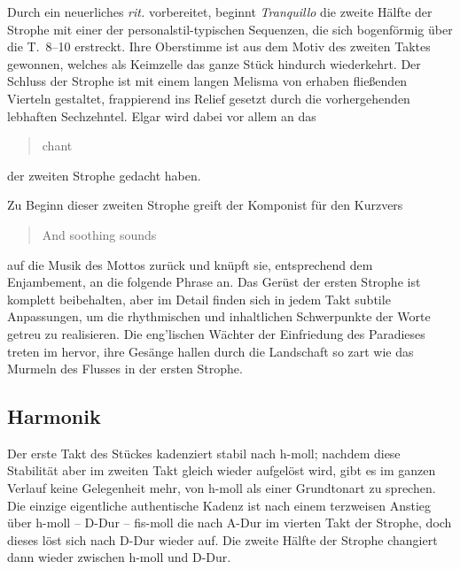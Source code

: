 \documentclass[a4paper,11pt,open=any]{scrbook}
\newcommand{\engquote}[1]{\foreignblockquote{english}{#1}}
\begin{document}
Durch ein neuerliches \textit{rit.} vorbereitet, beginnt \textit{Tranquillo}
die zweite Hälfte der Strophe mit einer der personalstil-typischen Sequenzen,
die sich bogenförmig über die T.~8–10 erstreckt.  Ihre Oberstimme ist aus dem
Motiv des zweiten Taktes gewonnen, welches als Keimzelle das ganze Stück
hindurch wiederkehrt.  Der Schluss der Strophe ist mit einem langen Melisma
von erhaben fließenden Vierteln gestaltet, frappierend ins Relief gesetzt
durch die vorhergehenden lebhaften Sechzehntel.  Elgar wird dabei vor allem
an das \engquote{chant} der zweiten Strophe gedacht haben.

Zu Beginn dieser zweiten Strophe greift der Komponist für den Kurzvers
\engquote{And soothing sounds} auf die Musik des Mottos zurück und knüpft
sie, entsprechend dem Enjambement, an die folgende Phrase an.  Das Gerüst
der ersten Strophe ist komplett beibehalten, aber im Detail finden sich in
jedem Takt subtile Anpassungen, um die rhythmischen und inhaltlichen
Schwerpunkte der Worte getreu zu realisieren.  Die eng’lischen Wächter
der Einfriedung des Paradieses treten im  hervor, ihre
Gesänge hallen durch die Landschaft so zart wie das Murmeln des Flusses
in der ersten Strophe.

\subsection*{Harmonik}
Der erste Takt des Stückes kadenziert stabil nach h-moll; nachdem diese
Stabilität aber im zweiten Takt gleich wieder aufgelöst wird, gibt es im
ganzen Verlauf keine Gelegenheit mehr, von h-moll als einer Grundtonart
zu sprechen.  Die einzige eigentliche authentische Kadenz ist nach einem
terzweisen Anstieg über h-moll – D-Dur – fis-moll die nach A-Dur im vierten
Takt der Strophe, doch dieses löst sich nach D-Dur wieder auf.  Die zweite
Hälfte der Strophe changiert dann wieder zwischen h-moll und D-Dur.
\end{document}

